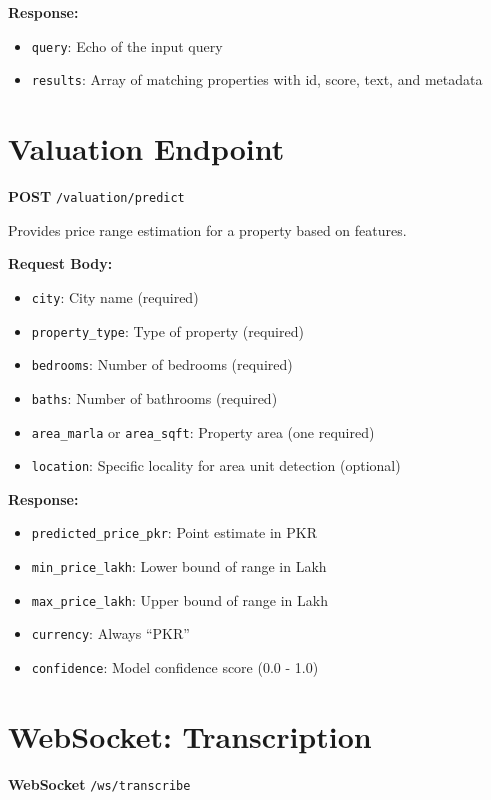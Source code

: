 \textbf{Response:}
\begin{itemize}
    \item \texttt{query}: Echo of the input query
    \item \texttt{results}: Array of matching properties with id, score, text, and metadata
\end{itemize}

\section{Valuation Endpoint}

\textbf{POST} \texttt{/valuation/predict}

Provides price range estimation for a property based on features.

\textbf{Request Body:}
\begin{itemize}
    \item \texttt{city}: City name (required)
    \item \texttt{property\_type}: Type of property (required)
    \item \texttt{bedrooms}: Number of bedrooms (required)
    \item \texttt{baths}: Number of bathrooms (required)
    \item \texttt{area\_marla} or \texttt{area\_sqft}: Property area (one required)
    \item \texttt{location}: Specific locality for area unit detection (optional)
\end{itemize}

\textbf{Response:}
\begin{itemize}
    \item \texttt{predicted\_price\_pkr}: Point estimate in PKR
    \item \texttt{min\_price\_lakh}: Lower bound of range in Lakh
    \item \texttt{max\_price\_lakh}: Upper bound of range in Lakh
    \item \texttt{currency}: Always ``PKR''
    \item \texttt{confidence}: Model confidence score (0.0 - 1.0)
\end{itemize}

\section{WebSocket: Transcription}

\textbf{WebSocket} \texttt{/ws/transcribe}

